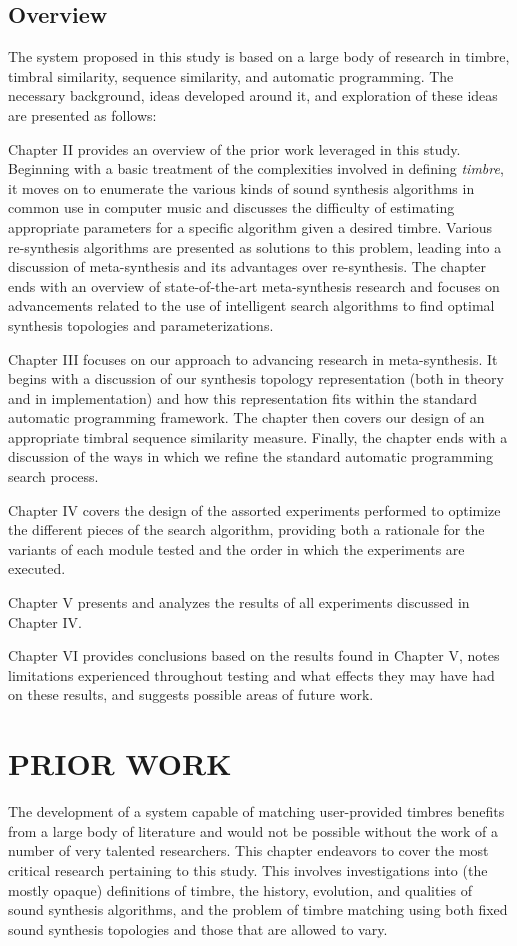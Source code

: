 \documentclass[12pt]{report} 	%
\numberwithin{figure}{chapter}
\numberwithin{table}{chapter}
\numberwithin{equation}{chapter}
\begin{document}
\begin{flushleft}
\section{Overview}
The system proposed in this study is based on a large body of research in timbre, timbral similarity, sequence similarity, and automatic programming. The necessary background, ideas developed around it, and exploration of these ideas are presented as follows:

Chapter II provides an overview of the prior work leveraged in this study. Beginning with a basic treatment of the complexities involved in defining \textit{timbre}, it moves on to enumerate the various kinds of sound synthesis algorithms in common use in computer music and discusses the difficulty of estimating appropriate parameters for a specific algorithm given a desired timbre. Various re-synthesis algorithms are presented as solutions to this problem, leading into a discussion of meta-synthesis and its advantages over re-synthesis. The chapter ends with an overview of state-of-the-art meta-synthesis research and focuses on advancements related to the use of intelligent search algorithms to find optimal synthesis topologies and parameterizations.

Chapter III focuses on our approach to advancing research in meta-synthesis. It begins with a discussion of our synthesis topology representation (both in theory and in implementation) and how this representation fits within the standard automatic programming framework. The chapter then covers our design of an appropriate timbral sequence similarity measure. Finally, the chapter ends with a discussion of the ways in which we refine the standard automatic programming search process.

Chapter IV covers the design of the assorted experiments performed to optimize the different pieces of the search algorithm, providing both a rationale for the variants of each module tested and the order in which the experiments are executed.

Chapter V presents and analyzes the results of all experiments discussed in Chapter IV.

Chapter VI provides conclusions based on the results found in Chapter V, notes limitations experienced throughout testing and what effects they may have had on these results, and suggests possible areas of future work.

\vspace*{\QuarterPage}
\chapter{PRIOR WORK} %
The development of a system capable of matching user-provided timbres benefits from a large body of literature and would not be possible without the work of a number of very talented researchers. This chapter endeavors to cover the most critical research pertaining to this study. This involves investigations into (the mostly opaque) definitions of timbre, the history, evolution, and qualities of sound synthesis algorithms, and the problem of timbre matching using both fixed sound synthesis topologies and those that are allowed to vary.
\vspace{12pt}

\end{flushleft}
\end{document}
